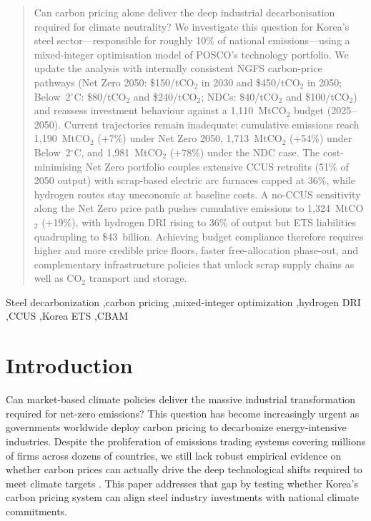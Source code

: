 \documentclass[preprint,1p,authoryear]{elsarticle}
\begin{document}
\begin{frontmatter}
\begin{abstract}
Can carbon pricing alone deliver the deep industrial decarbonisation required for climate neutrality? We investigate this question for Korea's steel sector—responsible for roughly 10\% of national emissions—using a mixed-integer optimisation model of POSCO's technology portfolio. We update the analysis with internally consistent NGFS carbon-price pathways (Net Zero 2050: \$150/tCO$_2$ in 2030 and \$450/tCO$_2$ in 2050; Below~2$^\circ$C: \$80/tCO$_2$ and \$240/tCO$_2$; NDCs: \$40/tCO$_2$ and \$100/tCO$_2$) and reassess investment behaviour against a 1,110~MtCO$_2$ budget (2025--2050). Current trajectories remain inadequate: cumulative emissions reach 1,190~MtCO$_2$ (+7\%) under Net Zero 2050, 1,713~MtCO$_2$ (+54\%) under Below~2$^\circ$C, and 1,981~MtCO$_2$ (+78\%) under the NDC case. The cost-minimising Net Zero portfolio couples extensive CCUS retrofits (51\% of 2050 output) with scrap-based electric arc furnaces capped at 36\%, while hydrogen routes stay uneconomic at baseline costs. A no-CCUS sensitivity along the Net Zero price path pushes cumulative emissions to 1,324~MtCO$_2$ (+19\%), with hydrogen DRI rising to 36\% of output but ETS liabilities quadrupling to \$43~billion. Achieving budget compliance therefore requires higher and more credible price floors, faster free-allocation phase-out, and complementary infrastructure policies that unlock scrap supply chains as well as CO$_2$ transport and storage.
\end{abstract}

\begin{keyword}
Steel decarbonization \sep carbon pricing \sep mixed-integer optimization \sep hydrogen DRI \sep CCUS \sep Korea ETS \sep CBAM
\end{keyword}
\end{frontmatter}

\section{Introduction}

Can market-based climate policies deliver the massive industrial transformation required for net-zero emissions? This question has become increasingly urgent as governments worldwide deploy carbon pricing to decarbonize energy-intensive industries. Despite the proliferation of emissions trading systems covering millions of firms across dozens of countries, we still lack robust empirical evidence on whether carbon prices can actually drive the deep technological shifts required to meet climate targets \citep{Green2021}. This paper addresses that gap by testing whether Korea's carbon pricing system can align steel industry investments with national climate commitments.
\end{document}
